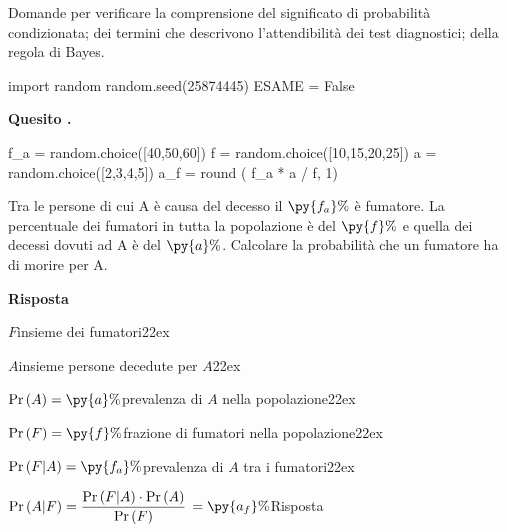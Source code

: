 \documentclass[11pt,twoside,a4paper]{article}
\def\Pr{{\rm Pr\,}}
\newcounter{quesito}
\newenvironment{question}{\bigskip\addtocounter{quesito}{1}\par\textbf{Quesito \thequesito.}}{\vspace{\parskip}}
\newenvironment{answer}{\par\textbf{Risposta\quad}}{\vspace{\parskip}}
\begin{document}
\colorbox{blue!10}{\begin{minipage}{\textwidth}
Domande per verificare la comprensione del significato di probabilità condizionata; dei termini che descrivono l'attendibilità dei test diagnostici; della regola di Bayes.
\end{minipage}}

\bigskip\bigskip

\begin{pycode}
import random
random.seed(25874445)
ESAME = False
\end{pycode}


\begin{question}
\def\Pr{{\rm Pr\,}}
\begin{pycode}
f_a = random.choice([40,50,60])
f = random.choice([10,15,20,25])
a = random.choice([2,3,4,5])
a_f = round ( f_a * a / f, 1)
\end{pycode}
Tra le persone di cui A è causa del decesso il $\py{f_a}\%$ è fumatore. La percentuale dei fumatori in tutta la popolazione è del $\py{f}\%$ e quella dei decessi dovuti ad A è del $\py{a}\%$. Calcolare la probabilità che un fumatore ha di morire per A.
\begin{answer}

$F$\hfill insieme dei fumatori\kern22ex

$A$\hfill insieme persone decedute per $A$\kern22ex

$\Pr(A)=\py{a}\%$\hfill prevalenza di $A$ nella popolazione\kern22ex

$\Pr(F)=\py{f}\%$\hfill frazione di fumatori nella popolazione\kern22ex

$\Pr(F|A)=\py{f_a}\%$\hfill prevalenza di $A$ tra i fumatori\kern22ex

$\Pr(A|F)=\dfrac{\Pr(F|A)\cdot \Pr(A)}{\Pr(F)}$ {\color{blue}$=\py{a_f}\%$\hfill Risposta}
\end{answer}
\end{question}
\end{document}
